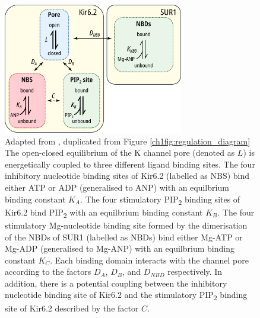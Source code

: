 \begin{figure}[h]
	\centering
	\includegraphics[width=0.7\textwidth]{regulation_diagram.pdf}
	\caption[Modes of regulation of K\ATP{} - reprinted]{
	Adapted from \cite{puljung_cryo-electron_2018}, duplicated from Figure \ref{ch1fig:regulation_diagram}
	The open-closed equilibrium of the K\ATP{} channel pore (denoted as $L$) is energetically coupled to three different ligand binding sites.
	The four inhibitory nucleotide binding sites of Kir6.2 (labelled as NBS) bind either ATP or ADP (generalised to ANP) with an equilbrium binding constant $K_A$.
	The four stimulatory PIP\textsubscript{2} binding sites of Kir6.2 bind PIP\textsubscript{2} with an equilbrium binding constant $K_B$.
	The four stimulatory Mg-nucleotide binding site formed by the dimerisation of the NBDs of SUR1 (labelled as NBDs) bind either Mg-ATP or Mg-ADP (generalised to Mg-ANP) with an equilbrium binding constant $K_C$.
	Each binding domain interacts with the channel pore according to the factors $D_A$, $D_B$, and $D_{NBD}$ respectively.
	In addition, there is a potential coupling between the inhibitory nucleotide binding site of Kir6.2 and the stimulatory PIP\textsubscript{2} binding site of Kir6.2 described by the factor $C$.
	}\label{ch7fig:regulation_diagram}
\end{figure}

